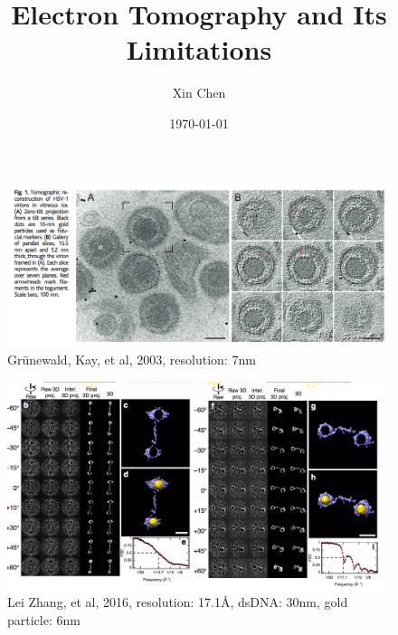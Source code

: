 \documentclass[slidestop,compress,12pt]{beamer}
\title{Electron Tomography and Its Limitations}
\author{Xin Chen}
\date{\today}
\begin{document}
\def\mean#1{\left< #1 \right>}
\frame{\titlepage}

\section[Existing works]{}

\begin{frame}
    \begin{figure}
        \includegraphics[width=12cm]{imgs/eg1.png}
        \caption{Grünewald, Kay, et al, 2003, resolution: 7nm}
    \end{figure}
\end{frame}

\begin{frame}
    \begin{figure}
        \includegraphics[width=11cm]{imgs/eg2.png}
        \caption{Lei Zhang, et al, 2016, resolution: 17.1\AA, dsDNA:  30nm, gold particle: 6nm}
    \end{figure}
\end{frame}
\end{document}
